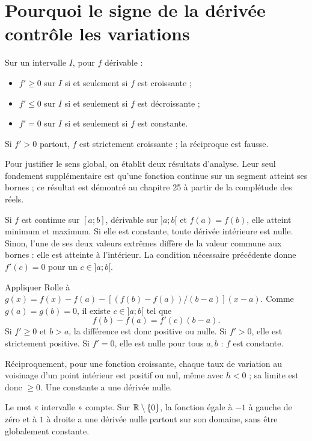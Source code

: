 \documentclass[../cours_1re.tex]{subfiles}
\begin{document}
\section{Pourquoi le signe de la dérivée contrôle les variations}
\begin{theoreme}
Sur un intervalle $I$, pour $f$ dérivable :
\begin{itemize}
\item $f'\ge0$ sur $I$ si et seulement si $f$ est croissante ;
\item $f'\le0$ sur $I$ si et seulement si $f$ est décroissante ;
\item $f'=0$ sur $I$ si et seulement si $f$ est constante.
\end{itemize}
Si $f'>0$ partout, $f$ est strictement croissante ; la réciproque est fausse.
\end{theoreme}
Pour justifier le sens global, on établit deux résultats d'analyse. Leur seul fondement supplémentaire est qu'une fonction continue sur un segment atteint ses bornes ; ce résultat est démontré au chapitre 25 à partir de la complétude des réels.
\begin{demonstration}[Rolle]
Si $f$ est continue sur $[a;b]$, dérivable sur $]a;b[$ et $f(a)=f(b)$, elle atteint minimum et maximum. Si elle est constante, toute dérivée intérieure est nulle. Sinon, l'une de ses deux valeurs extrêmes diffère de la valeur commune aux bornes : elle est atteinte à l'intérieur. La condition nécessaire précédente donne $f'(c)=0$ pour un $c\in]a;b[$.
\end{demonstration}
\begin{demonstration}
Appliquer Rolle à
$g(x)=f(x)-f(a)-[(f(b)-f(a))/(b-a)](x-a)$.
Comme $g(a)=g(b)=0$, il existe $c\in]a;b[$ tel que
\[
f(b)-f(a)=f'(c)(b-a).
\]
Si $f'\ge0$ et $b>a$, la différence est donc positive ou nulle. Si $f'>0$, elle est strictement positive. Si $f'=0$, elle est nulle pour tous $a,b$ : $f$ est constante.
\end{demonstration}
Réciproquement, pour une fonction croissante, chaque taux de variation au voisinage d'un point intérieur est positif ou nul, même avec $h<0$ ; sa limite est donc $\ge0$. Une constante a une dérivée nulle.
\begin{attention}
Le mot « intervalle » compte. Sur $\mathbb{R}\setminus\{0\}$, la fonction égale à $-1$ à gauche de zéro et à $1$ à droite a une dérivée nulle partout sur son domaine, sans être globalement constante.
\end{attention}
\end{document}

